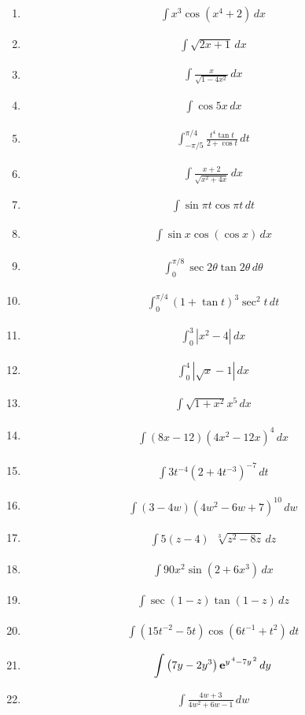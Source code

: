 \documentclass[twoside, fleqn,12pt,letterpaper]{book}
\newcommand{\makeitem}[2]{\item {#2}\begin{align*} {#1}
  \end{align*}}
\newcommand{\makeitemtextb}[1]{\makeitem{{#1}}{\cite{RosTextbook}}}
\newcommand{\makeitemlamar}[1]{\makeitem{{#1}}{\cite{lamar}}}
\begin{document}
\begin{multicols}{2}
\begin{enumerate}
 \makeitemtextb{\int x^3\cos{(x^4+2)} \, dx} 
 
 \makeitemtextb{\int \sqrt{2x+1} \, dx} 
 
 \makeitemtextb{\int \frac{x}{\sqrt{1-4x^2}} \, dx}
 
 \makeitemtextb{\int \cos{5x} \, dx}
  
  \makeitemtextb{\int_{-\pi/5}^{\pi/4} \frac{t^4\tan{t}}{2 + \cos{t}} \, dt} 
  
  \makeitemtextb{\int \frac{x+2}{\sqrt{x^2+4x}} \, dx}
  
  
  \makeitemtextb{\int \sin{\pi t} \cos{\pi t} \, dt}
  
  \makeitemtextb{\int \sin{x} \cos({\cos{x}}) \, dx }
  
  \makeitemtextb{\int_{0}^{\pi/8} \sec{2\theta} \tan{2\theta} \, d\theta }
  
  \makeitemtextb{\int_{0}^{\pi/4} (1+\tan{t})^3 \sec^2{t} \, dt} 
  
  \makeitemtextb{\int_{0}^{3} |x^2-4| \, dx} 
  
  \makeitemtextb{\int_{0}^{4} |\sqrt{x}-1| \, dx} 
  
  \makeitemtextb{\int \sqrt{1+x^2} x^5 \, dx} 
  
  \makeitemlamar{\displaystyle \int   {{\left( {8x - 12} \right){{\left( {4{x^2} - 12x} \right)}^4}\,dx}}}
  
  \makeitemlamar{\displaystyle \int   {{3{t^{ - 4}}{{\left( {2 + 4{t^{ - 3}}} \right)}^{ - 7}}\,dt}}}
  
  \makeitemlamar{\displaystyle \int   {{\left( {3 - 4w} \right){{\left( {4{w^2} - 6w + 7} \right)}^{10}}\,dw}}}
  
  \makeitemlamar{\displaystyle \int   {{5\left( {z - 4} \right)\,\,\,\sqrt[3]{{{z^2} - 8z}}\,dz}}}
  
  \makeitemlamar{\displaystyle \int   {{90{x^2}\sin \left( {2 + 6{x^3}} \right)\,dx}}}
  
  \makeitemlamar{\displaystyle \int   {{\sec \left( {1 - z} \right)\tan \left( {1 - z} \right)\,dz}}}
  
  \makeitemlamar{\displaystyle \int   {{\left( {15{t^{ - 2}} - 5t} \right)\cos \left( {6{t^{ - 1}} + {t^2}} \right)\,dt}}}
  
  \makeitemlamar{\displaystyle \int   {{\left( {7y - 2{y^3}} \right){{\bf{e}}^{{y^{\,4}} - 7{y^{\,2}}}}\,dy}}}
  
  \makeitemlamar{\displaystyle \int   {{\frac{{4w + 3}}{{4{w^2} + 6w - 1}}\,dw}}}


\end{enumerate}
\end{multicols}



 
\end{document}
